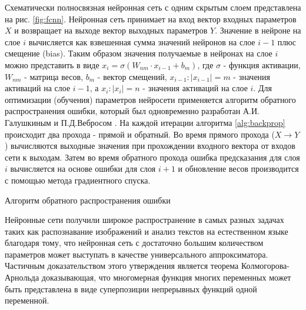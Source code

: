 Схематически полносвязная нейронная сеть с одним скрытым слоем представлена на рис. \ref{fig:fcnn}. Нейронная сеть принимает на вход вектор входных параметров $X$ и возвращает на выходе вектор выходных параметров $Y$. Значение в нейроне на слое $i$ вычисляется как взвешенная сумма значений нейронов на слое $i - 1$ плюс смещение (bias). Таким образом значения получаемые в нейронах на слое $i$ можно представить в виде $x_i = \sigma(W_{nm} \cdot x_{i - 1} + b_m)$, где $\sigma$ - функция активации, $W_{nm}$ - матрица весов, $b_m$ - вектор смещений, $x_{i - 1}: |x_{i - 1}| = m$ - значения активаций на слое $i - 1$, а $x_{i}: |x_{i}| = n$ - значения активаций на слое $i$. Для оптимизации (обучения) параметров нейросети применяется алгоритм обратного распространения ошибки, который был одновременно разработан А.И. Галушкиным \cite{Galushkin} и П.Д.Вебросом \cite{webros_1974}. На каждой итерации алгоритма \ref{alg:backprop} происходит два прохода - прямой и обратный. Во время прямого прохода ($X \to Y$) вычисляются выходные значения при прохождении входного вектора от входов сети к выходам. Затем во время обратного прохода ошибка предсказания для слоя $i$ вычисляется на основе ошибки для слоя $i + 1$ и обновление весов производится с помощью метода градиентного спуска. 

\begin{algorithm}[ht]
	\SetAlgoLined
	\caption{Алгоритм обратного распространения ошибки}
	\label{alg:backprop}

\end{algorithm}

Нейронные сети получили широкое распространение в самых разных задачах таких как распознавание изображений \cite{alexnet} и анализ текстов на естественном языке \cite{bert} благодаря тому, что нейронная сеть с достаточно большим количеством параметров может выступать в качестве универсального аппроксиматора. Частичным доказательством этого утверждения является теорема Колмогорова-Арнольда\cite{kolmogorov, arnold} доказывающая, что многомерная функция многих переменных может быть представлена в виде суперпозиции непрерывных функций одной переменной. 

